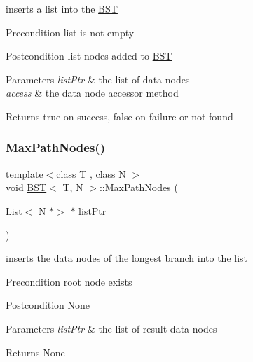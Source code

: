 inserts a list into the \hyperlink{class_b_s_t}{B\+ST} \begin{DoxyPrecond}{Precondition}
list is not empty 
\end{DoxyPrecond}
\begin{DoxyPostcond}{Postcondition}
list nodes added to \hyperlink{class_b_s_t}{B\+ST} 
\end{DoxyPostcond}

\begin{DoxyParams}{Parameters}
{\em list\+Ptr} & the list of data nodes \\
\hline
{\em access} & the data node accessor method \\
\hline
\end{DoxyParams}
\begin{DoxyReturn}{Returns}
true on success, false on failure or not found 
\end{DoxyReturn}
\mbox{\label{class_b_s_t_a757799b702dc9729c0b7e63b63b91647}} 
\subsubsection{\texorpdfstring{Max\+Path\+Nodes()}{MaxPathNodes()}}
{\footnotesize\ttfamily template$<$class T , class N $>$ \\
void \hyperlink{class_b_s_t}{B\+ST}$<$ T, N $>$\+::Max\+Path\+Nodes (\begin{DoxyParamCaption}\item[{\hyperlink{class_list}{List}$<$ N $\ast$$>$ $\ast$}]{list\+Ptr }\end{DoxyParamCaption})}

inserts the data nodes of the longest branch into the list \begin{DoxyPrecond}{Precondition}
root node exists 
\end{DoxyPrecond}
\begin{DoxyPostcond}{Postcondition}
None 
\end{DoxyPostcond}

\begin{DoxyParams}{Parameters}
{\em list\+Ptr} & the list of result data nodes \\
\hline
\end{DoxyParams}
\begin{DoxyReturn}{Returns}
None 
\end{DoxyReturn}
\mbox{\label{class_b_s_t_a86fb81e20a21ef65e2b57e55d910d875}} 
